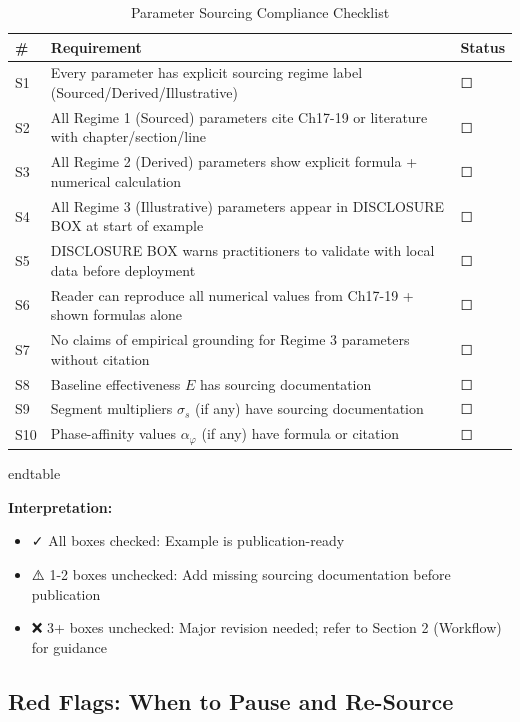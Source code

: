 \begin{table}[htbp]
\centering
\caption{Parameter Sourcing Compliance Checklist}
\label{tab:jjj-checklist}
\renewcommand{\arraystretch}{1.5}
\small
\begin{tabular}{@{}p{1cm}p{6cm}p{2.5cm}@{}}
\toprule
\textbf{\#} & \textbf{Requirement} & \textbf{Status} \\
\midrule
S1 & Every parameter has explicit sourcing regime label (Sourced/Derived/Illustrative) & ☐ \\
S2 & All Regime 1 (Sourced) parameters cite Ch17-19 or literature with chapter/section/line & ☐ \\
S3 & All Regime 2 (Derived) parameters show explicit formula + numerical calculation & ☐ \\
S4 & All Regime 3 (Illustrative) parameters appear in DISCLOSURE BOX at start of example & ☐ \\
S5 & DISCLOSURE BOX warns practitioners to validate with local data before deployment & ☐ \\
S6 & Reader can reproduce all numerical values from Ch17-19 + shown formulas alone & ☐ \\
S7 & No claims of empirical grounding for Regime 3 parameters without citation & ☐ \\
S8 & Baseline effectiveness $E$ has sourcing documentation & ☐ \\
S9 & Segment multipliers $\sigma_s$ (if any) have sourcing documentation & ☐ \\
S10 & Phase-affinity values $\alpha_\varphi$ (if any) have formula or citation & ☐ \\
\bottomrule
\end{tabular}
end{table}

\textbf{Interpretation:}
\begin{itemize}[nosep]
\item ✓ All boxes checked: Example is publication-ready
\item ⚠️ 1-2 boxes unchecked: Add missing sourcing documentation before publication
\item ❌ 3+ boxes unchecked: Major revision needed; refer to Section 2 (Workflow) for guidance
\end{itemize}

\subsection{Red Flags: When to Pause and Re-Source}
\label{subsec:jjj-redflags}


\end{table}
